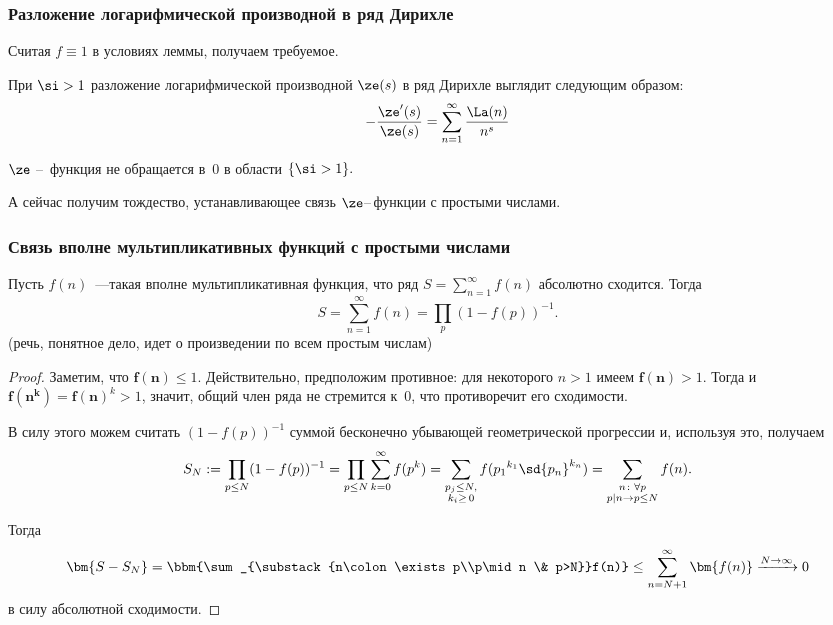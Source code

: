 \subsubsection{Разложение логарифмической производной в ряд Дирихле}

Считая $f\equiv1$ в условиях леммы, получаем требуемое.
\begin{stm}
  При $\si>1$ разложение логарифмической производной $\ze(s)$ в ряд Дирихле выглядит следующим образом:
  $$
    -\frac{\ze'(s)}{\ze(s)}=\sum_{n=1}^\infty \frac{\La(n)}{n^s}
  $$
\end{stm}

\begin{imp}
  $\ze$ -- \,функция не обращается в~$0$ в области $\{\si>1\}.$
\end{imp}\par

А сейчас получим тождество, устанавливающее связь $\ze$--\,функции с простыми числами.

\subsubsection{Связь вполне мультипликативных функций с простыми числами}

\begin{lemma}
  Пусть $f(n)$~—такая вполне мультипликативная функция, что ряд $S=\sum\limits_{n=1}^\infty f(n)$ абсолютно сходится. Тогда
  $$
    S=\sum_{n=1}^\infty f(n)=\prod_p(1-f(p))^{-1}.
  $$
  (речь, понятное дело, идет о произведении по всем простым числам)
\end{lemma}

\begin{proof}
  Заметим, что $\bm{f(n)}\le1$. Действительно, предположим противное: для некоторого $n>1$ имеем $\bm{f(n)}>1$. Тогда и
  $\bm{f(n^k)}=\bm{f(n)}^k>1$, значит, общий член ряда не стремится к~0, что противоречит его сходимости.

  В силу этого можем считать $(1-f(p))^{-1}$ суммой бесконечно убывающей геометрической прогрессии и, используя это, получаем
  $$
    S_N:=\prod_{p\le N}(1-f(p))^{-1}=\prod_{p\le N}\sum_{k=0}^\infty f(p^k)
    =\sum_{\substack{p_j\le N,\\k_i\ge\,0}}f({p_1}^{k_1}\sd{p_n}^{k_n})=\sum_{\substack{n\colon\forall p\\p\mid n\rightarrow p\le N}}f(n).
  $$

  Тогда
  $$
    \bm{S-S_N}=\bbm{\sum_{\substack{n\colon\exists p\\p\mid n \& p>N}}f(n)}\le\sum_{n=N+1}^\infty\bm{f(n)}\xrightarrow{N\rightarrow\infty}0
  $$
  в силу абсолютной сходимости.
\end{proof}

